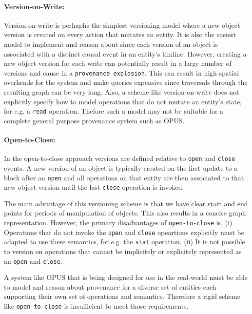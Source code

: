 \documentclass[withindex,glossary]{cam-thesis}
\begin{document}
\paragraph{Version-on-Write:}
Version-on-write is perhaphs the simplest versioning model where a new object version is created on every action that mutates an entity.
It is also the easiest model to implement and reason about since each version of an object is associated with a distinct causal event in an entity's timline.
However, creating a new object version for each write can potentially result in a large number of versions and cause in a \texttt{provenance explosion}.
This can result in high spatial overheads for the system and make queries expensive since traversals through the resulting graph can be very long.
Also, a scheme like version-on-write does not explicitly specify how to model operations that do not mutate an entity's state, for e.g. a \texttt{read} operation.
Thefore such a model may not be suitable for a complete general purpose provenance system such as OPUS.

\paragraph{Open-to-Close:}
In the open-to-close approach versions are defined relative to \texttt{open} and \texttt{close} events.
A new version of an object is typically created on the first update to a block after an \texttt{open} and all operations on that entity are then associated to that new object version until the last \texttt{close} operation is invoked.

The main advantage of this versioning scheme is that we have clear start and end points for periods of manipulation of objects.
This also results in a concise graph representation.
However, the primary disadvantages of \texttt{open-to-close} is,
(i) Operations that do not invoke the \texttt{open} and \texttt{close} opeartions explicitly must be adapted to use these semantics, for e.g. the \texttt{stat} operation.
(ii) It is not possible to version on operations that cannot be implicitely or explicitely represented as an \texttt{open} and \texttt{close}.

A system like OPUS that is being designed for use in the real-world must be able to model and reason about provenance for a diverse set of entities each supporting their own set of operations and semantics. Therefore a rigid scheme like \texttt{open-to-close} is insufficient to meet those requirements.
\end{document}
